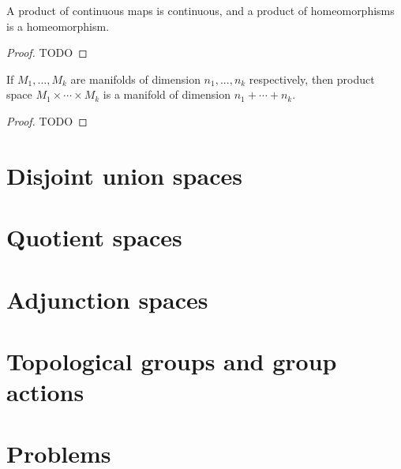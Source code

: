 \begin{proposition}
	A product of continuous maps is continuous, and a product of homeomorphisms is a homeomorphism.
	\begin{proof}
		TODO
	\end{proof}
\end{proposition}

\begin{proposition}
	If $ M_{1},...,M_{k} $ are manifolds of dimension $ n_{1},...,n_{k} $ respectively, then product space $ M_{1}\times \cdots \times M_{k} $ is a manifold of dimension $ n_{1}+ \cdots +n_{k} $.
	\begin{proof}
		TODO
	\end{proof}
\end{proposition}

\section{Disjoint union spaces}
\section{Quotient spaces}
\section{Adjunction spaces}
\section{Topological groups and group actions}
\section{Problems}

